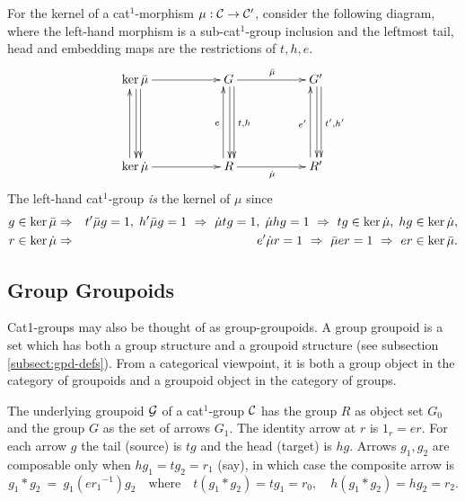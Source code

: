 For the kernel of a cat$^1$-morphism $\mu : \mathcal{C} \to \mathcal{C}'$, 
consider the following diagram, where the left-hand morphism is a 
sub-cat$^1$-group inclusion and the leftmost tail, head and embedding maps 
are the restrictions of $t,h,e$. 
\begin{equation*} \label{eq:cat1kernel}
\vcenter{\xymatrix{
   \ker\barm \ar[rr] \ar[dd]<1.0ex> \ar[dd]<0.2ex> 
     && G \ar[dd]<1.0ex>^{t,h} \ar[dd]<0.2ex> \ar[rr]^{\barm}
          && G' \ar[dd]<1.0ex>^{t',h'} \ar[dd]<0.2ex>  \\
     &&  \\
   \ker\dm \ar[rr] \ar[uu]<1.0ex> 
     && R \ar[uu]<1.0ex>^{e} \ar[rr]_{\dm}
          && R' \ar[uu]<1.0ex>^{e'} 
}}
\end{equation*}
The left-hand cat$^1$-group \emph{is} the kernel of $\mu$ since 
\begin{eqnarray*}
g \in \ker\bar{\mu} 
  & \Rightarrow 
    & t'\bar{\mu} g = 1,\; h'\bar{\mu} g = 1 ~\Rightarrow~ 
      \dot{\mu} tg = 1,\; \dot{\mu} hg = 1 ~\Rightarrow~ 
      tg \in \ker\dot{\mu},\; hg \in \ker\dot{\mu}, \\
r \in \ker\dot{\mu} 
  & \Rightarrow 
    & e'\dot{\mu} r = 1 ~\Rightarrow~ 
      \bar{\mu} er = 1 ~\Rightarrow~ 
      er \in \ker\bar{\mu}. 
\end{eqnarray*}

\subsection{Group Groupoids} \label{subs:gpgpd}  

Cat1-groups may also be thought of as group-groupoids.
A group groupoid is a set which has both a group structure and
a groupoid structure (see subsection \ref{subsect:gpd-defs}). 
From a categorical viewpoint, it is both a group object in the
category of groupoids and a groupoid object in the category of groups.

The underlying groupoid $\mathcal{G}$  of a cat$^1$-group  $\mathcal{C}$ 
has the group $R$ as object set $G_0$ 
and the group $G$ as the set of arrows $G_1$. 
The identity arrow at  $r$  is  $1_r = er$. 
For each arrow  $g$  the tail (source) is  $tg$ and the head (target) is $hg$. 
Arrows  $g_1,g_2$  are composable only when  $hg_1 = tg_2 = r_1$ (say),
in which case the composite arrow is
\begin{equation} \label{eq:gpgpd-comp}
g_1 * g_2 ~=~ g_1(e{r_1}^{-1})g_2 
\quad\mbox{where}\quad
t(g_1 * g_2) = tg_1 = r_0, \quad
h(g_1 * g_2) = hg_2 = r_2.
\end{equation}

